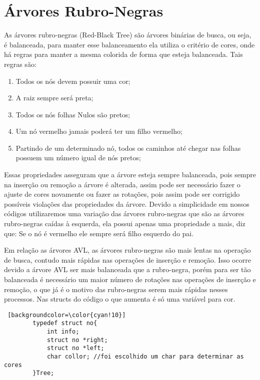 \documentclass[report]{uftex}
\begin{document}
\chapter{Árvores Rubro-Negras}
\label{sec:arvores rubro-negras}
    \noindent As árvores rubro-negras (Red-Black Tree) são árvores binárias de busca, ou seja, é balanceada, para manter esse balanceamento ela utiliza o critério de cores, onde há regras para manter a mesma colorida de forma que esteja balanceada. Tais regras são:
    \begin{enumerate}
        \item Todos os nós devem possuir uma cor;
        \item A raiz sempre será preta;
        \item Todos os nós folhas Nulos são pretos;
        \item Um nó vermelho jamais poderá ter um filho vermelho;
        \item Partindo de um determinado nó, todos os caminhos até chegar nas folhas possuem um número igual de nós pretos;
    \end{enumerate}
    
    Essas propriedades asseguram que a árvore esteja sempre balanceada, pois sempre na inserção ou remoção a árvore é alterada, assim pode ser necessário fazer o ajuste de cores novamente ou fazer as rotações, pois assim pode ser corrigido possíveis violações das propriedades da árvore. Devido a simplicidade em nossos códigos utilizaremos uma variação das árvores rubro-negras que são as árvores rubro-negras caídas à esquerda, ela possui apenas uma propriedade a mais, diz que: Se o nó é vermelho ele sempre será filho esquerdo do pai.
    
    Em relação as árvores AVL, as árvores rubro-negras são mais lentas na operação de busca, contudo mais rápidas nas operações de inserção e remoção. Isso ocorre devido a árvore AVL ser mais balanceada que a rubro-negra, porém para ser tão balanceada é necessário um maior número de rotações nas operações de inserção e remoção, o que já é o motivo das rubro-negras serem mais rápidas nesses processos. Nas structs do código o que aumenta é só uma variável para cor.
    
    \begin{lstlisting} [backgroundcolor=\color{cyan!10}]
        typedef struct no{
            int info;
            struct no *right;
            struct no *left;
            char collor; //foi escolhido um char para determinar as cores
        }Tree;
    \end{lstlisting}
\end{document}
